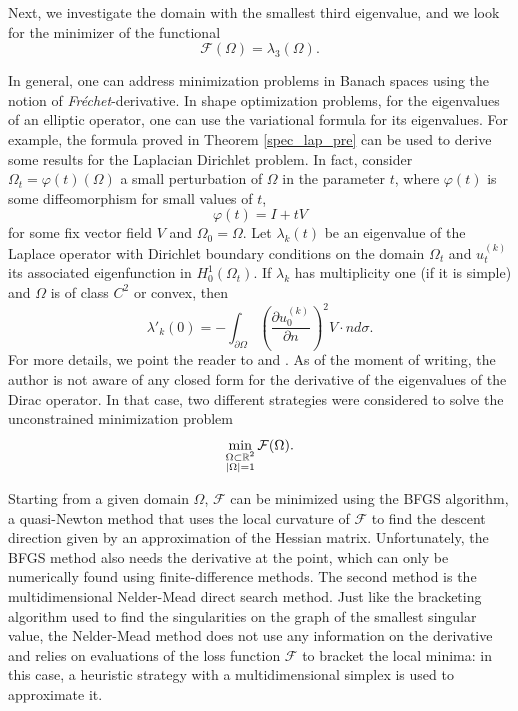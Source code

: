 Next, we investigate the domain with the smallest third eigenvalue, and we look for the minimizer of the functional
\begin{equation*}%
    \mathcal{F}(\Omega) = \lambda_3(\Omega).
\end{equation*}

In general, one can address minimization problems in Banach spaces using the notion of \textit{Fréchet}-derivative. In shape optimization problems, for the eigenvalues of an elliptic operator, one can use the variational formula for its eigenvalues. For example, the formula proved in Theorem \ref{spec_lap_pre} can be used to derive some results for the Laplacian Dirichlet problem. In fact, consider \(\Omega_t = \varphi(t)(\Omega)\) a small perturbation of \(\Omega\) in the parameter \(t\), where \(\varphi(t)\) is some diffeomorphism for small values of \(t\), 
\[
    \varphi(t) = I + t V
\]
for some fix vector field \(V\) and \(\Omega_0 = \Omega\). Let  \(\lambda_k(t)\) be an eigenvalue of the Laplace operator with Dirichlet boundary conditions on the domain \(\Omega_t\) and \(u^{(k)}_t\) its associated eigenfunction in \(H^1_0(\Omega_t)\). If \(\lambda_k\) has multiplicity one (if it is simple) and \(\Omega\) is of class \(C^2\) or convex, then
\[
    \lambda'_k(0) =- \int_{\partial\Omega} \left(\frac{\partial u^{(k)}_0}{\partial n}\right)^2 V\cdot n d \sigma.
\]
For more details, we point the reader to \cite{henrot2006extremum} and \cite{kato2013perturbation}.
As of the moment of writing, the author is not aware of any closed form for the derivative of the eigenvalues of the Dirac operator. In that case, two different strategies were considered to solve the unconstrained minimization problem
\begin{equation}\label{dirac_unconstrained_min_lambda_3}
    \min_{\substack{\Omega \subset \mathbb{R}^2 \\ \abs{\Omega}=1}} \mathcal{F}(\Omega).
\end{equation}

Starting from a given domain \(\Omega\), \(\mathcal{F}\) can be minimized using the \ac{BFGS} algorithm, a quasi-Newton method that uses the local curvature of \(\mathcal{F}\) to find the descent direction given by an approximation of the Hessian matrix. Unfortunately, the \ac{BFGS} method also needs the derivative at the point, which can only be numerically found using finite-difference methods. The second method is the multidimensional Nelder-Mead direct search method. Just like the bracketing algorithm used to find the singularities on the graph of the smallest singular value, the Nelder-Mead method does not use any information on the derivative and relies on evaluations of the loss function \(\mathcal{F}\) to bracket the local minima: in this case, a heuristic strategy with a multidimensional simplex is used to approximate it.

